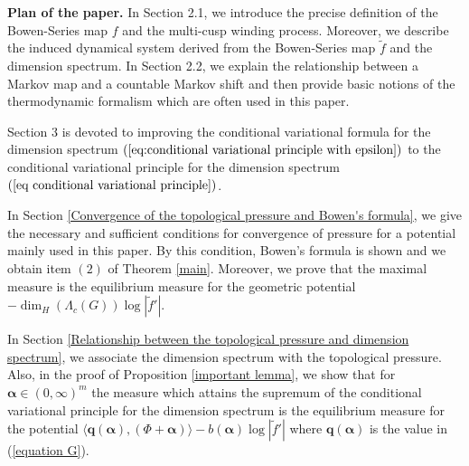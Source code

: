 \documentclass{article}
\theoremstyle{definition}
\begin{document}
\textbf{Plan of the paper.}
In Section 2.1, we introduce the precise definition of the Bowen-Series map $f$ and the multi-cusp winding process. Moreover, we describe the induced dynamical system derived from the Bowen-Series map $\tilde f$ and the dimension spectrum. In Section 2.2, we explain the relationship between a Markov map and a countable Markov shift and then provide basic notions of the thermodynamic formalism which are often used in this paper. 

Section 3 is devoted to improving the conditional variational formula for the dimension spectrum $(\ref{eq:conditional variational principle with epsilon})$ to the conditional variational principle for the dimension spectrum $(\ref{eq conditional variational principle})$.

In Section \ref{Convergence of the topological pressure and Bowen's formula}, we give the necessary and sufficient conditions for convergence of pressure for a potential mainly used in this paper. By this condition,  Bowen's formula is shown and we obtain item $(2)$ of Theorem \ref{main}. Moreover, we prove that the maximal measure is the equilibrium measure for the geometric potential $-\dim_H(\Lambda_c(G))\log|\tilde f'|$. 

In Section \ref{Relationship between the topological pressure and dimension spectrum}, we associate the dimension spectrum with the topological pressure. Also, in the proof of Proposition \ref{important lemma}, we show that for $\boldsymbol{\alpha}\in(0,\infty)^m$ the measure which attains the supremum of the conditional variational principle for the dimension spectrum is the equilibrium measure for the potential $\langle\boldsymbol{q}(\boldsymbol{\alpha}),(\Phi+\boldsymbol{\alpha})\rangle-b(\boldsymbol{\alpha})\log|\tilde f'|$ where $\boldsymbol{q}(\boldsymbol{\alpha})$ is the value in (\ref{equation G}). 

\end{document}
